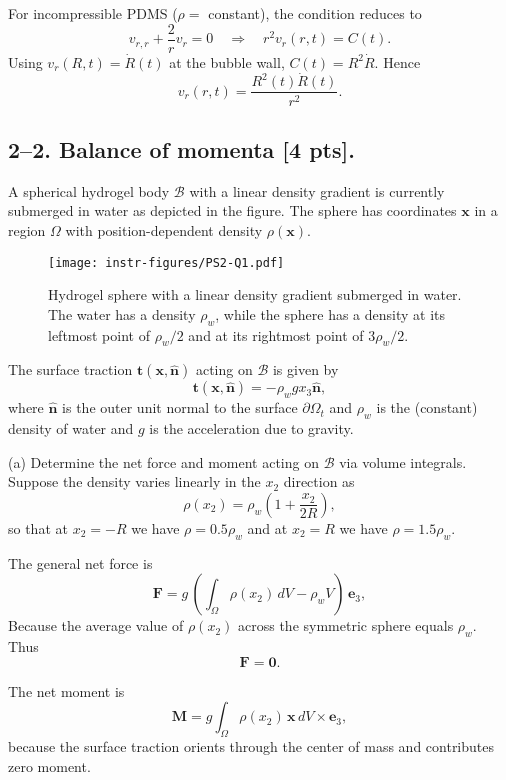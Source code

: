 For incompressible PDMS ($\rho=$ constant), the condition reduces to
$$
v_{r,r} + \frac{2}{r} v_r = 0 \quad \Longrightarrow \quad r^2 v_r(r,t) = C(t).
$$
Using $v_r(R,t) = \dot R(t)$ at the bubble wall, $C(t) = R^2 \dot R$. Hence
$$
v_r(r,t) = \frac{R^2(t)\dot R(t)}{r^2}.
$$

\medskip
\subsection*{2--2. \textbf{Balance of momenta} [4 pts].} A spherical hydrogel body $\mathcal{B}$ with a linear density gradient is currently submerged in water as depicted in the figure. 
The sphere has coordinates $\bm{x}$ in a region $\Omega$ with position-dependent density $\rho(\bm{x})$. 

\begin{figure}[H]
\vspace{-2em}
\centering
\texttt{[image: instr-figures/PS2-Q1.pdf]}      
\caption{\small{Hydrogel sphere with a linear density gradient submerged in water. The water has a density $\rho_w$, while the sphere has a density at its leftmost point of $\rho_w/2$ and at its rightmost point of $3\rho_w/2$.}}
\end{figure}

\vspace{-1em}
The surface traction $\bm{t}(\bm{x},\hat{\bm{n}})$ acting on $\mathcal{B}$ is given by 
\begin{equation*}
\bm{t}(\bm{x},\hat{\bm{n}}) = -\rho_w g x_3 \hat{\bm{n}},
\end{equation*}
where $\hat{\bm{n}}$ is the outer unit normal to the surface $\partial \Omega_t$ and $\rho_w$ is the (constant) density of water and $g$ is the acceleration due to gravity. 

\medskip
(a) Determine the net force and moment acting on $\mathcal{B}$ via volume integrals.
Suppose the density varies linearly in the $x_2$ direction as
$$
\rho(x_2) = \rho_w \left( 1 + \frac{x_2}{2R} \right),
$$
so that at $x_2=-R$ we have $\rho = 0.5\rho_w$ and at $x_2=R$ we have $\rho=1.5\rho_w$.

The general net force is
$$
\bm F = g \,(\int_\Omega \rho(x_2)\,dV - \rho_w V)\,\bm e_3,
$$
Because the average value of $\rho(x_2)$ across the symmetric sphere equals $\rho_w$. Thus
$$
\bm F = \bm 0.
$$

The net moment is
$$
\bm M = g \int_\Omega \rho(x_2)\,\bm x\,dV \times \bm e_3,
$$
because the surface traction orients through the center of mass and contributes zero moment.

